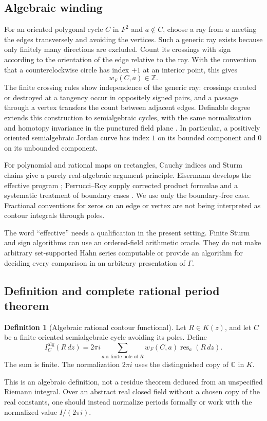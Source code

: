 \documentclass[11pt,letterpaper]{article}
\theoremstyle{definition}
\newtheorem{definition}[theorem]{Definition}
\theoremstyle{remark}
\newcommand{\C}{\mathbb C}
\newcommand{\Z}{\mathbb Z}
\newcommand{\res}{\operatorname{res}}
\numberwithin{equation}{section}
\begin{document}
\subsection{Algebraic winding}
For an oriented polygonal cycle $C$ in $F^2$ and $a\notin C$, choose a ray from $a$ meeting the edges transversely and avoiding the vertices. Such a generic ray exists because only finitely many directions are excluded. Count its crossings with sign according to the orientation of the edge relative to the ray. With the convention that a counterclockwise circle has index $+1$ at an interior point, this gives
\[
w_F(C,a)\in\Z.
\]
The finite crossing rules show independence of the generic ray: crossings created or destroyed at a tangency occur in oppositely signed pairs, and a passage through a vertex transfers the count between adjacent edges. Definable degree extends this construction to semialgebraic cycles, with the same normalization and homotopy invariance in the punctured field plane \cite{BO}. In particular, a positively oriented semialgebraic Jordan curve has index $1$ on its bounded component and $0$ on its unbounded component.

For polynomial and rational maps on rectangles, Cauchy indices and Sturm chains give a purely real-algebraic argument principle. Eisermann develops the effective program \cite{Eis}; Perrucci--Roy supply corrected product formulae and a systematic treatment of boundary cases \cite{PR}. We use only the boundary-free case. Fractional conventions for zeros on an edge or vertex are not being interpreted as contour integrals through poles.

The word ``effective'' needs a qualification in the present setting. Finite Sturm and sign algorithms can use an ordered-field arithmetic oracle. They do not make arbitrary set-supported Hahn series computable or provide an algorithm for deciding every comparison in an arbitrary presentation of $\Gamma$.

\subsection{Definition and complete rational period theorem}
\begin{definition}[Algebraic rational contour functional]\label{def:algperiod}
Let $R\in K(z)$, and let $C$ be a finite oriented semialgebraic cycle avoiding its poles. Define
\begin{equation}\label{eq:algperiod}
I_C^{\mathrm{alg}}(R\,dz)
=2\pi i\sum_{a\text{ a finite pole of }R}
 w_F(C,a)\res_a(R\,dz).
\end{equation}
The sum is finite. The normalization $2\pi i$ uses the distinguished copy of $\C$ in $K$.
\end{definition}
This is an algebraic definition, not a residue theorem deduced from an unspecified Riemann integral. Over an abstract real closed field without a chosen copy of the real constants, one should instead normalize periods formally or work with the normalized value $I/(2\pi i)$.
\end{document}
